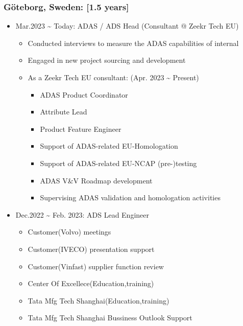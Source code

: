 \documentclass[12pt,a4paper]{article}
\begin{document}
\subsubsection{Göteborg, Sweden: [1.5 years]}
\begin{itemize}
\item Mar.2023 {\textasciitilde} Today: ADAS / ADS Head (Consultant @ Zeekr Tech EU)

\begin{itemize}
\item Conducted interviews to measure the ADAS capabilities of internal


\item Engaged in new project sourcing and development 


\item As a Zeekr Tech EU consultant: (Apr. 2023 {\textasciitilde} Present)

\begin{itemize}
\item ADAS Product Coordinator 


\item Attribute Lead 


\item Product Feature Engineer 


\item Support of ADAS-related EU-Homologation


\item Support of ADAS-related EU-NCAP (pre-)testing


\item ADAS V\&V Roadmap development


\item Supervising ADAS validation and homologation activities

\end{itemize}
\end{itemize}

\item Dec.2022 {\textasciitilde} Feb. 2023: ADS Lead Engineer 

\begin{itemize}
\item Customer(Volvo) meetings


\item Customer(IVECO) presentation support


\item Customer(Vinfast) supplier function review


\item Center Of Excellece(Education,training)


\item Tata Mfg Tech Shanghai(Education,training)


\item Tata Mfg Tech Shanghai Bussiness Outlook Support

\end{itemize}
\end{itemize}
\end{document}
